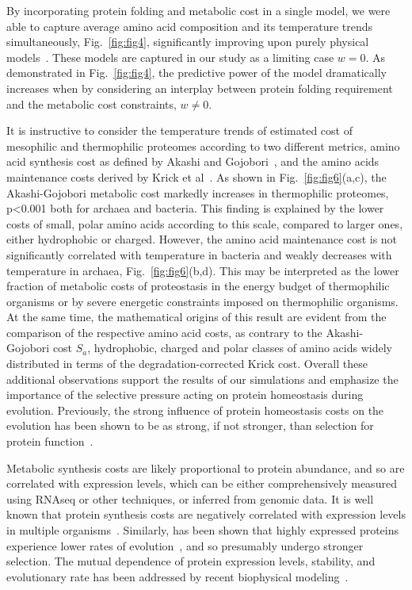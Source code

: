 \documentclass[10pt,letterpaper]{article}
\begin{document}
By incorporating protein folding and metabolic cost in a single model, we were able to capture average amino acid composition and its temperature trends simultaneously, Fig.~\ref{fig:fig4}, significantly improving upon purely physical models~\cite{Berezovsky2007Positive,Venev2015Massively}. These  models are captured in our study as a limiting case $w=0$. As demonstrated in Fig.~\ref{fig:fig4}, the predictive power of the model dramatically increases when by considering an interplay between protein folding requirement and the metabolic cost constraints, $w\neq 0$.

It is instructive to consider the temperature trends of estimated cost of mesophilic and thermophilic proteomes according to two different metrics, amino acid synthesis cost as defined by Akashi and Gojobori~\cite{Akashi2002Metabolic}, and the amino acids maintenance costs derived by Krick et al~\cite{Krick2014Amino}. As shown in Fig.~\ref{fig:fig6}(a,c), the Akashi-Gojobori metabolic cost markedly increases in thermophilic proteomes, p\textless 0.001 both for archaea and bacteria. This finding is explained by the lower costs of small, polar amino acids according to this scale, compared to larger ones, either hydrophobic or charged. However, the amino acid maintenance cost is not significantly correlated with temperature in bacteria and weakly decreases with temperature in archaea, Fig.~\ref{fig:fig6}(b,d).  This may be interpreted as the lower fraction of metabolic costs  of proteostasis in the energy budget of thermophilic organisms or by severe energetic constraints imposed on thermophilic organisms. At the same time, the mathematical origins of this result are evident from the comparison of the respective amino acid costs, as contrary to the Akashi-Gojobori cost $S_{a}$, hydrophobic, charged and polar classes of amino acids widely distributed in terms of the degradation-corrected Krick cost. Overall these additional observations support the results of our simulations and emphasize the importance of the selective pressure acting on protein homeostasis during evolution. Previously, the strong influence of protein homeostasis costs on the evolution has been shown to be as strong, if not stronger, than selection for protein function~\cite{Assis2014Conserved}.

Metabolic synthesis costs are likely proportional to protein abundance, and so are correlated with expression levels, which can be either comprehensively measured using RNAseq or other techniques, or inferred from genomic data. It is well known that protein synthesis costs are negatively correlated with expression levels in multiple organisms~\cite{Akashi2002Metabolic,Seligmann2003CostMinimization,Heizer2006Amino,Raiford2008Do}. Similarly, has been shown that highly expressed proteins experience lower rates of evolution~\cite{Pal2001Highly,Rocha2004An,Drummond2005Why}, and so presumably undergo stronger selection. The mutual dependence of protein expression levels, stability, and evolutionary rate has been addressed by recent biophysical modeling~\cite{Serohijos2012Protein}.
\end{document}
